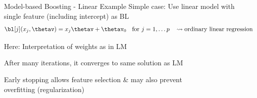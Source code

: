 \documentclass[10pt,compress,t,notes=noshow, xcolor=table]{beamer}
\begin{document}
\begin{framev}[align=top]{Model-based Boosting - Linear Example}
Simple case: Use linear model with single feature (including intercept) as BL
$$
\bl[j](x_j, \thetav) = x_j\thetav + \thetav_0 \hspace*{0.2cm}\text{ for } j = 1,\ldots p \hspace*{0.3cm} \leadsto \text{ordinary linear regression}
$$
\begin{itemizeM}
\item<1-> Here: Interpretation of weights as in LM
\item<1-> After many iterations, it converges to same solution as LM %
\item<2-> Early stopping allows feature selection \& may also prevent\\ overfitting (regularization)
\end{itemizeM}
\spacer[0.25]
\end{framev}
\end{document}
